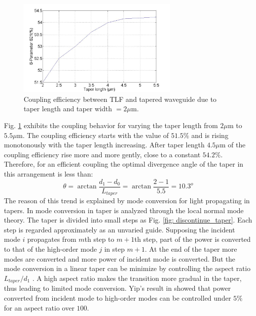 \begin{figure}[!ht]
\centering
\includegraphics[width=0.7\textwidth]{bilder/tapered_waveguide_dxx}
\caption{Coupling efficiency between TLF and tapered waveguide due to taper length and taper width $= 2\mu$m.}
\label{fig:tapered_waveguide_dxx}
\end{figure}
Fig. \ref{fig:tapered_waveguide_dxx} exhibits the coupling behavior for varying the taper length from $2\mu$m to $5.5\mu$m. The coupling efficiency starts with the value of $51.5\%$ and is rising monotonously with the taper length increasing. After taper length $4.5\mu$m of the coupling efficiency rise more and more gently, close to a constant $54.2\%$. 
Therefore, for an efficient coupling the optimal divergence angle of the taper in this arrangement is less than:
\begin{equation}
\theta=\arctan\frac{d_{1}-d_{0}}{L_{taper}}=\arctan\frac{2-1}{5.5}=10.3^{o}
\label{eq:divergence_angle}
\end{equation}
The reason of this trend is explained by mode conversion for light propagating in tapers. In \cite{integrated_optics,mode_conversion_optical_waveguide} mode conversion in taper is analyzed through the local normal mode theory. The taper is divided into small steps as Fig. \ref{fig: discontinue_taper}. Each step is regarded approximately as an unvaried guide. Supposing the incident mode $i$ propagates from $m$th step to $m+1$th step, part of the power is converted to that of the high-order mode $j$ in step $m+1$. At the end of the taper more modes are converted and more power of incident mode is converted. But the mode conversion in a linear taper can be minimize by controlling the aspect ratio $L_{taper}/d_{1}$ . A high aspect ratio makes the transition more gradual in the taper, thus leading to limited mode conversion. Yip's result in \cite{mode_conversion_optical_waveguide} showed that power converted from incident mode to high-order modes can be controlled under $5\%$ for an aspect ratio over $100$.\\

